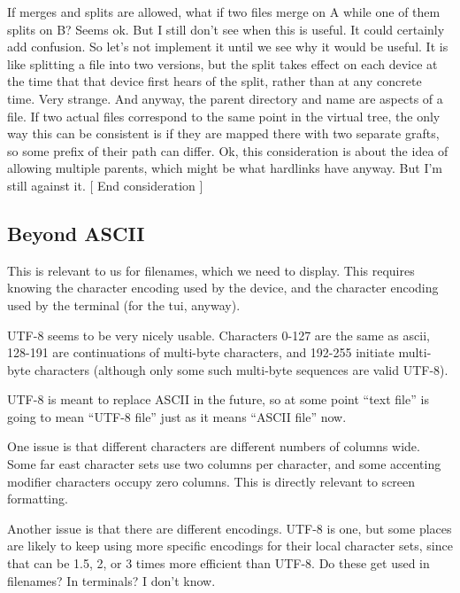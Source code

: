 \documentclass{book}
\begin{document}
  If merges and splits are allowed, what if two files merge on A while one of them splits on B?  Seems ok.  But I still don't see when this is useful.  It could certainly add confusion.  So let's not implement it until we see why it would be useful.  It is like splitting a file into two versions, but the split takes effect on each device at the time that that device first hears of the split, rather than at any concrete time.  Very strange.
  And anyway, the parent directory and name are aspects of a file.  If two actual files correspond to the same point in the virtual tree, the only way this can be consistent is if they are mapped there with two separate grafts, so some prefix of their path can differ.  Ok, this consideration is about the idea of allowing multiple parents, which might be what hardlinks have anyway.  But I'm still against it.
[ End consideration ]





\subsection{Beyond ASCII}

This is relevant to us for filenames, which we need to display.  This requires knowing the character encoding used by the device, and the character encoding used by the terminal (for the tui, anyway).

UTF-8 seems to be very nicely usable.  Characters 0-127 are the same as ascii, 128-191 are continuations of multi-byte characters, and 192-255 initiate multi-byte characters (although only some such multi-byte sequences are valid UTF-8).

UTF-8 is meant to replace ASCII in the future, so at some point ``text file'' is going to mean ``UTF-8 file'' just as it means ``ASCII file'' now.

One issue is that different characters are different numbers of columns wide.  Some far east character sets use two columns per character, and some accenting modifier characters occupy zero columns.  This is directly relevant to screen formatting.

Another issue is that there are different encodings.  UTF-8 is one, but some places are likely to keep using more specific encodings for their local character sets, since that can be 1.5, 2, or 3 times more efficient than UTF-8.  Do these get used in filenames?  In terminals?  I don't know.
\end{document}
